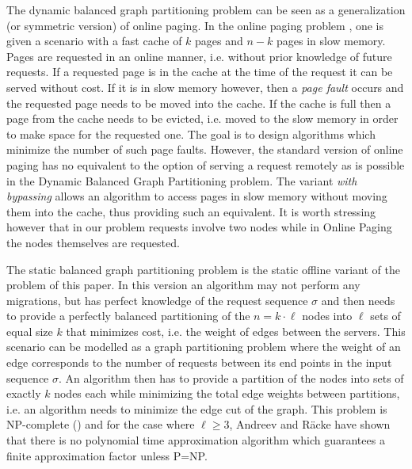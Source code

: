 \documentclass[a4paper,UKenglish,cleveref, autoref, thm-restate,authorcolumns]{../lipics/lipics-v2019}
\begin{document}
The dynamic balanced graph partitioning problem 
can be seen as a generalization (or symmetric version) of online paging.
In the online paging problem \cite{Fiat2002}, \cite{Epstein2011}
 one is given a scenario with a fast cache of $k$ pages and $n-k$ pages in slow memory. Pages are requested in an online manner, i.e. without prior knowledge of future requests. If a requested page is in the cache at the time of the request it can be served without cost. If it is in slow memory however, then a \textit{page fault} occurs and the requested page needs to be moved into the cache. If the cache is full then a page from the cache needs to be evicted, i.e. moved to the slow memory in order to make space for the requested one. The goal is to design algorithms which minimize the number of such page faults.
However, the standard version of online paging has no equivalent to the option of serving a request remotely as is possible in the Dynamic Balanced Graph Partitioning problem. The variant \textit{with bypassing} allows an algorithm to access pages in slow memory without moving them into the cache, thus providing such an equivalent. It is worth stressing however that in our problem requests involve two nodes while in Online Paging the nodes themselves are requested.

The static balanced graph partitioning problem is the static offline variant of the problem of this paper. In this version an algorithm may not perform any migrations, but has perfect knowledge of the request sequence $\sigma$ and then needs to provide a perfectly balanced partitioning of the $n=k\cdot \ell$ nodes into $\ell$ sets of equal size $k$ that minimizes cost, i.e. the weight of edges between the servers. This scenario can be modelled as a graph partitioning problem where the weight of an edge corresponds to the number of requests between its end points in the input sequence $\sigma$. 
An algorithm then has to provide a partition of the nodes into sets of exactly $k$ nodes each while minimizing the total edge weights between partitions, i.e. an algorithm needs to minimize the edge cut of the graph.  
This problem is NP-complete (\cite{Andreev2006}) and for the case where $\ell\geq 3$, Andreev and R\"acke \cite{Andreev2006} have shown that there is no polynomial time approximation algorithm which guarantees a finite approximation factor unless P=NP.
\end{document}
